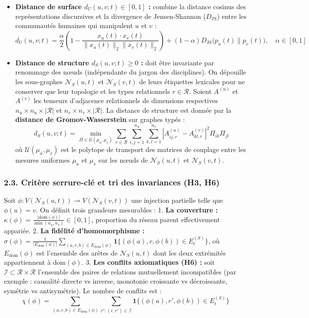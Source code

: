 \documentclass[a4paper,11pt]{article}
\begin{document}
\begin{itemize}
\item
  \textbf{Distance de surface \(d_U(u, v; t) \in [0, 1]\) :} combine la
  distance cosinus des représentations discursives et la divergence de
  Jensen-Shannon (\(D_{\text{JS}}\)) entre les communautés humaines qui
  manipulent \(u\) et \(v\) :
  \[d_U(u, v; t) = \frac{\alpha}{2}\left(1 - \frac{x_u(t) \cdot x_v(t)}{\|x_u(t)\|_2 \|x_v(t)\|_2}\right) + (1 - \alpha) D_{\text{JS}}\big(p_u(t) \parallel p_v(t)\big), \quad \alpha \in [0,1]\]
\item
  \textbf{Distance de structure \(d_S(u, v; t) \ge 0\) :} doit être
  invariante par renommage des nœuds (indépendante du jargon des
  disciplines). On dépouille les sous-graphes \(\mathcal{N}_S(u, t)\) et
  \(\mathcal{N}_S(v, t)\) de leurs étiquettes lexicales pour ne
  conserver que leur topologie et les types relationnels
  \(r \in \mathcal{R}\). Soient \(A^{(u)}\) et \(A^{(v)}\) les tenseurs
  d'adjacence relationnels de dimensions respectives
  \(n_u \times n_u \times |\mathcal{R}|\) et
  \(n_v \times n_v \times |\mathcal{R}|\). La distance de structure est
  donnée par la \textbf{distance de Gromov-Wasserstein} sur graphes
  typés :
  \[d_S(u, v; t) = \min_{\Pi \in \mathcal{U}(\mu_u, \mu_v)} \sum_{r \in \mathcal{R}} \sum_{i,j=1}^{n_u} \sum_{k,l=1}^{n_v} \left| A^{(u)}_{ij,r} - A^{(v)}_{kl,r} \right|^2 \Pi_{ik} \Pi_{jl}\]
  où \(\mathcal{U}(\mu_u, \mu_v)\) est le polytope de transport des
  matrices de couplage entre les mesures uniformes \(\mu_u\) et
  \(\mu_v\) sur les nœuds de \(\mathcal{N}_S(u, t)\) et
  \(\mathcal{N}_S(v, t)\).
\end{itemize}

\subsubsection*{2.3. Critère serrure-clé et tri des invariances (H3, H6)}

Soit
\(\phi : V(\mathcal{N}_S(u,t)) \rightharpoonup V(\mathcal{N}_S(v,t))\)
une injection partielle telle que \(\phi(u) = v\). On définit trois
grandeurs mesurables : 1. \textbf{La couverture :}
\(\kappa(\phi) = \frac{|\text{dom}(\phi)|}{\min(n_u, n_v)} \in [0, 1]\),
proportion du réseau parent effectivement appariée. 2. \textbf{La
fidélité d'homomorphisme :}
\(\sigma(\phi) = \frac{1}{|E_{\text{dom}}(\phi)|} \sum_{(a,r,b) \in E_{\text{dom}}(\phi)} \mathbf{1}\big\{(\phi(a), r, \phi(b)) \in E^{(S)}_t\big\}\),
où \(E_{\text{dom}}(\phi)\) est l'ensemble des arêtes de
\(\mathcal{N}_S(u,t)\) dont les deux extrémités appartiennent à
\(\text{dom}(\phi)\). 3. \textbf{Les conflits axiomatiques (H6) :} soit
\(\mathcal{I} \subset \mathcal{R} \times \mathcal{R}\) l'ensemble des
paires de relations mutuellement incompatibles (par exemple : causalité
directe vs inverse, monotonie croissante vs décroissante, symétrie vs
antisymétrie). Le nombre de conflits est :
\[\chi(\phi) = \sum_{(a,r,b) \in E_{\text{dom}}(\phi)} \sum_{r' : (r,r') \in \mathcal{I}} \mathbf{1}\big\{(\phi(a), r', \phi(b)) \in E^{(S)}_t\big\}\]
\end{document}
